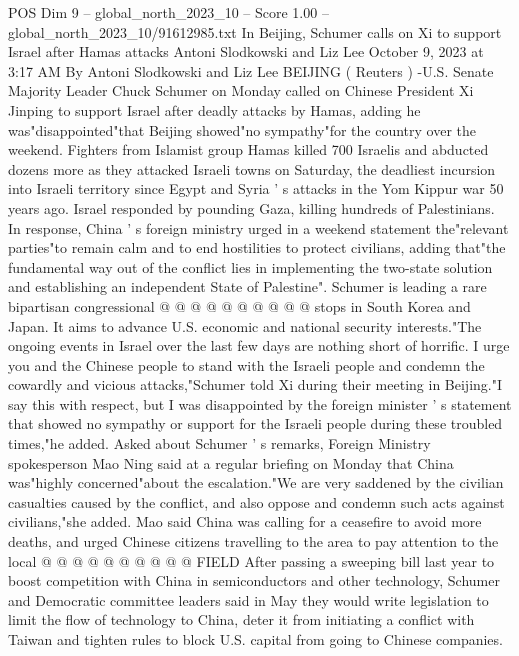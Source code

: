 \begin{textsample}{POS Dim 9 – global\_north\_2023\_10 – Score 1.00 – global\_north\_2023\_10/91612985.txt}  \label{ex:f9_pos_412}
In Beijing, Schumer calls on Xi to support Israel after Hamas attacks Antoni Slodkowski and Liz Lee October 9, 2023 at 3:17 AM By Antoni Slodkowski and Liz Lee BEIJING ( Reuters ) -U.S.
Senate Majority Leader Chuck Schumer on Monday called on Chinese President Xi Jinping to support Israel after deadly attacks by Hamas, adding he was"disappointed"that Beijing showed"no sympathy"for the country over the weekend.
Fighters from Islamist group Hamas killed 700 Israelis and abducted dozens more as they attacked Israeli towns on Saturday, the deadliest incursion into Israeli territory since Egypt and Syria ' s attacks in the Yom Kippur war 50 years ago.
Israel responded by pounding Gaza, killing hundreds of Palestinians.
In response, China ' s foreign ministry urged in a weekend statement the"relevant parties"to remain calm and to end hostilities to protect civilians, adding that"the fundamental way out of the conflict lies in implementing the two-state solution and establishing an independent State of Palestine".
Schumer is leading a rare bipartisan congressional @ @ @ @ @ @ @ @ @ @ stops in South Korea and Japan.
It aims to advance U.S. economic and national security interests."The ongoing events in Israel over the last few days are nothing short of horrific.
I urge you and the Chinese people to stand with the Israeli people and condemn the cowardly and vicious attacks,"Schumer told Xi during their meeting in Beijing."I say this with respect, but I was disappointed by the foreign minister ' s statement that showed no sympathy or support for the Israeli people during these troubled times,"he added.
Asked about Schumer ' s remarks, Foreign Ministry spokesperson Mao Ning said at a regular briefing on Monday that China was"highly concerned"about the escalation."We are very saddened by the civilian casualties caused by the conflict, and also oppose and condemn such acts against civilians,"she added.
Mao said China was calling for a ceasefire to avoid more deaths, and urged Chinese citizens travelling to the area to pay attention to the local @ @ @ @ @ @ @ @ @ @ FIELD After passing a sweeping bill last year to boost competition with China in semiconductors and other technology, Schumer and Democratic committee leaders said in May they would write legislation to limit the flow of technology to China, deter it from initiating a conflict with Taiwan and tighten rules to block U.S. capital from going to Chinese companies.

\end{textsample}
